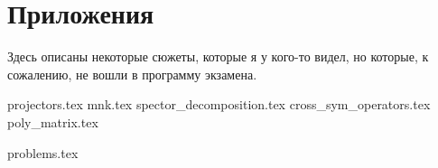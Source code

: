 \documentclass[a4paper, 11pt]{article}
\begin{document}
\newpage

\setcounter{problem}{0}

\section{Приложения}

Здесь описаны некоторые сюжеты, которые я у кого-то видел, но которые, к сожалению, не вошли в программу экзамена.

{projectors.tex}
{mnk.tex}
{spector_decomposition.tex}
{cross_sym_operators.tex}
{poly_matrix.tex}

\newpage

\setcounter{problem}{0}

{problems.tex}
\end{document}
